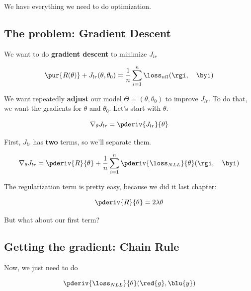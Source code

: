     We have everything we need to do optimization.
    
    \subsection{The problem: Gradient Descent}
    
        We want to do \textbf{gradient descent} to minimize $J_{lr}$
        
        \begin{equation}
            \pur{ R(\theta) }
            +
            J_{lr}(\theta,\theta_0)
            =
            \frac{1}{n}
            \sum_{i=1}^n 
            \loss_{nll}(\rgi ,\quad \byi)
        \end{equation}
        
        We want repeatedly \textbf{adjust} our model $\Theta=(\theta,\theta_0)$ to improve $J_{lr}$. To do that, we want the gradients for $\theta$ and $\theta_0$. Let's start with $\theta$.
        
        \begin{equation}
            \nabla_\theta J_{lr} = \pderiv{J_{lr}}{\theta}
        \end{equation}
        
        First, $J_{lr}$ has \textbf{two} terms, so we'll separate them.
        
        \begin{equation}
            \nabla_\theta J_{lr} = 
            \pderiv{R}{\theta} + \frac{1}{n} \sum_{i=1}^{n }
                \pderiv{\loss_{NLL}}{\theta} (\rgi ,\quad \byi)
        \end{equation}
        
        The regularization term is pretty easy, because we did it last chapter:
        
        \begin{equation}
            \pderiv{R}{\theta} = 2 \lambda \theta
        \end{equation}
        
        But what about our first term?
    
    \subsection{Getting the gradient: Chain Rule}
    
        Now, we just need to do
        
        \begin{equation}
            \pderiv{\loss_{NLL}}{\theta} (\red{g} , \blu{y})
        \end{equation}
    
